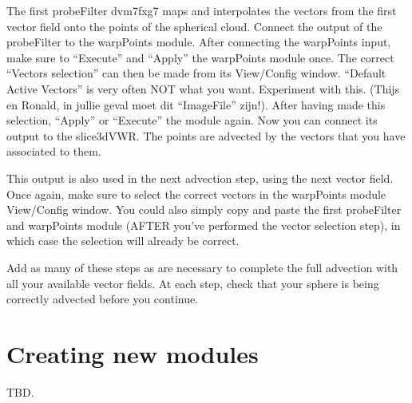 The first probeFilter dvm7fxg7 maps and interpolates the vectors from
the first vector field onto the points of the spherical cloud.
Connect the output of the probeFilter to the warpPoints module.  After
connecting the warpPoints input, make sure to ``Execute'' and
``Apply'' the warpPoints module once.  The correct ``Vectors
selection'' can then be made from its View/Config window.  ``Default
Active Vectors'' is very often NOT what you want.  Experiment with
this.  (Thijs en Ronald, in jullie geval moet dit ``ImageFile''
zijn!).  After having made this selection, ``Apply'' or ``Execute''
the module again.  Now you can connect its output to the slice3dVWR.
The points are advected by the vectors that you have associated to
them.

This output is also used in the next advection step, using the next
vector field.  Once again, make sure to select the correct vectors in
the warpPoints module View/Config window.  You could also simply copy
and paste the first probeFilter and warpPoints module (AFTER you've
performed the vector selection step), in which case the selection will
already be correct.

Add as many of these steps as are necessary to complete the full
advection with all your available vector fields.  At each step, check
that your sphere is being correctly advected before you continue.

\chapter{Creating new modules}
TBD.

%

%
\setfooter{\thepage}{}{}{}{}{\thepage}%
\printindex%


